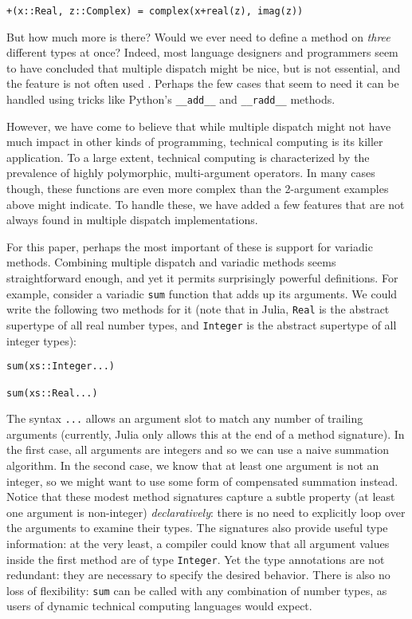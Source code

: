 \documentclass[preprint]{sigplanconf}
\newcommand{\code}[1]{\texttt{#1}}
\begin{document}
\begin{verbatim}
+(x::Real, z::Complex) = complex(x+real(z), imag(z))
\end{verbatim}

But how much more is there? Would we ever need to define a method on
\emph{three} different types at once? Indeed, most language designers and
programmers seem to have concluded that multiple dispatch might be nice, but is
not essential, and the feature is not often used \cite{Muschevici:2008}.
Perhaps the few cases that seem to need it can be handled using tricks like
Python's \code{\_\_add\_\_} and \code{\_\_radd\_\_} methods.

However, we have come to believe that while multiple dispatch might not
have much impact in other kinds of programming, technical computing is its
killer application. To a large extent, technical computing is characterized
by the prevalence of highly polymorphic, multi-argument operators. In many
cases though, these functions are even more complex than the 2-argument
examples above might indicate. To handle these, we have added a few
features that are not always found in multiple dispatch implementations.

For this paper, perhaps the most important of these is support for
variadic methods. Combining multiple dispatch and variadic methods
seems straightforward
enough, and yet it permits surprisingly powerful definitions. For example,
consider a variadic \code{sum} function that adds up its arguments. We could
write the following two methods for it (note that in Julia, \code{Real} is
the abstract supertype of all real number types, and \code{Integer} is the
abstract supertype of all integer types):

\begin{verbatim}
sum(xs::Integer...)

sum(xs::Real...)
\end{verbatim}

The syntax \code{...} allows an argument slot to match any number of trailing
arguments (currently, Julia only allows this at the end of a method signature).
In the first case, all arguments are integers and so we can use a naive
summation algorithm. In the second case, we know that at least one argument
is not an integer, so we might want to use some form of compensated
summation instead. Notice that these modest method signatures
capture a subtle property (at least one argument is non-integer)
\emph{declaratively}: there is no need to explicitly loop over the arguments
to examine their types. The signatures also provide useful type information:
at the very least, a compiler could know that all argument values inside
the first method are of type \code{Integer}. Yet the type annotations
are not redundant: they are necessary to specify the desired behavior. There
is also no loss of flexibility: \code{sum} can be called with any combination
of number types, as users of dynamic technical computing languages would expect.
\end{document}
